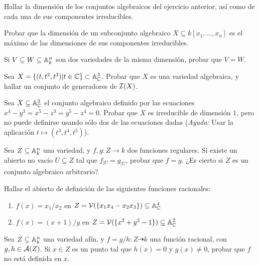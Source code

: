 \documentclass[ACGA.tex]{subfiles}
\begin{document}
\begin{ejer}
 Hallar la dimensión de los conjuntos algebraicos del ejercicio anterior, así como de cada una de sus componentes irreducibles.
\end{ejer}


\begin{ejer}
 Probar que la dimensión de un subconjunto algebraico $X\subseteq k[x_1,\ldots,x_n]$ es el máximo de las dimensiones de sus componentes irreducibles.
\end{ejer}

\begin{ejer}
 Si $V\subseteq W\subseteq\mathbb{A}^n_k$ son dos variedades de la misma dimensión, probar que $V=W$.
\end{ejer}

\begin{ejer}
 Sea $X=\{(t,t^2,t^3)|t\in\mathbb{C}\}\subset\mathbb{A}^3_{\mathbb{C}}$. Probar que $X$ es una variedad algebraica, y hallar un conjunto de generadores de $\mathcal{I}(X)$.
\end{ejer}


\begin{ejer}
 Sea $X\subseteq\mathbb{A}^3_{\mathbb{C}}$ el conjunto algebraico definido por las ecuaciones $x^4-y^3=x^5-z^3=y^5-z^4=0$. Probar que $X$ es irreducible de dimensión $1$, pero no puede definirse usando sólo dos de las ecuaciones dadas (\emph{Ayuda:} Usar la aplicación $t\mapsto(t^3,t^4,t^5)$).
\end{ejer}


\begin{ejer}\label{extensionfuncion}
 Sea $Z\subseteq\mathbb{A}^n_k$ una variedad, y $f,g:Z\to k$ dos funciones regulares. Si existe un abierto no vacío $U\subseteq Z$ tal que $f_{|U}=g_{|U}$, probar que $f=g$. ¿Es cierto si $Z$ es un conjunto algebraico arbitrario?
\end{ejer}

\begin{ejer}
 Hallar el abierto de definición de las siguientes funciones racionales:
\begin{enumerate}
 \item $f(x)=x_1/x_2$ en $Z=\mathcal{V}(\{x_1x_4-x_2x_3\})\subseteq\mathbb{A}^4_{\mathbb{C}}$
\item $f(x)=(x+1)/y$ en $Z=\mathcal{V}(\{x^2+y^2-1\})\subseteq\mathbb{A}^2_{\mathbb{C}}$
\end{enumerate}

\end{ejer}

\begin{ejer}
 Sea $Z\subseteq\mathbb{A}^n_k$ una variedad afín, y $f=g/h:Z\dashrightarrow k$ una función racional, con $g,h\in\mathcal{A}(Z)$. Si $x\in Z$ es un punto tal que $h(x)=0$ y $g(x)\neq 0$, probar que $f$ no está definida en $x$.
\end{ejer}
\end{document}
